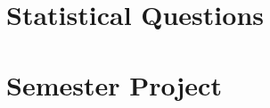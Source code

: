 \documentclass[11pt,a4paper]{report}
\begin{document}

\tableofcontents

\chapter{Statistical Questions}


\chapter{Semester Project}





\end{document}
